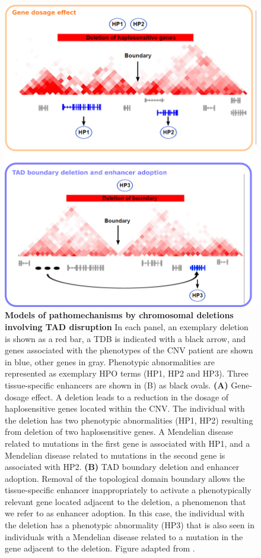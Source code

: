 \documentclass[a4paper,twoside=true,openright,parskip=full,chapterprefix=true,11pt,headings=normal,bibliography=totoc,listof=totoc,titlepage=on,captions=tableabove,draft=false]{scrreprt}
\theoremstyle{definition}
\theoremstyle{definition}
\theoremstyle{definition}
\theoremstyle{remark}
\begin{document}
\begin{figure}

{\centering \includegraphics[width=0.6\linewidth]{figures/GDE_vs_TDBD_v03} 

}

\caption{\textbf{Models of pathomechanisms by chromosomal
deletions involving TAD disruption} In each panel, an exemplary deletion
is shown as a red bar, a TDB is indicated with a black arrow, and genes
associated with the phenotypes of the CNV patient are shown in blue,
other genes in gray. Phenotypic abnormalities are represented as
exemplary HPO terms (HP1, HP2 and HP3). Three tissue-specific enhancers
are shown in (B) as black ovals. \textbf{(A)} Gene-dosage effect. A
deletion leads to a reduction in the dosage of haplosensitive genes
located within the CNV. The individual with the deletion has two
phenotypic abnormalities (HP1, HP2) resulting from deletion of two
haplosensitive genes. A Mendelian disease related to mutations in the
first gene is associated with HP1, and a Mendelian disease related to
mutations in the second gene is associated with HP2. \textbf{(B)} TAD
boundary deletion and enhancer adoption. Removal of the topological
domain boundary allows the tissue-specific enhancer inappropriately to
activate a phenotypically relevant gene located adjacent to the
deletion, a phenomenon that we refer to as enhancer adoption. In this
case, the individual with the deletion has a phenotypic abnormality
(HP3) that is also seen in individuals with a Mendelian disease related
to a mutation in the gene adjacent to the deletion. Figure adapted from
\citep{Ibn-Salem2014}.}\label{fig:EnhancerAdoption}
\end{figure}
\end{document}
